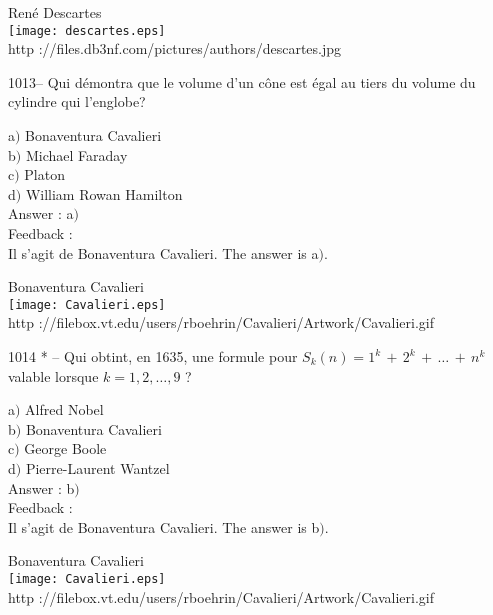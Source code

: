 ﻿\documentclass[letterpaper, 12pt]{article}
\begin{document}
        \begin{center}
        Ren\'e Descartes\\
    \texttt{[image: descartes.eps]}\\
        {\footnotesize http
://files.db3nf.com/pictures/authors/descartes.jpg}
    \end{center}

1013-- Qui d\'emontra que le volume d'un c\^one est \'egal au tiers
du volume du cylindre qui l'englobe?

a$)$ Bonaventura Cavalieri \\
b$)$ Michael Faraday \\
c$)$ Platon \\
d$)$ William Rowan Hamilton\\

Answer : a$)$\\

Feedback : \\
Il s'agit de Bonaventura Cavalieri.
The answer is a$)$.\\

        \begin{center}
        Bonaventura Cavalieri\\
    \texttt{[image: Cavalieri.eps]}\\
        {\footnotesize http
://filebox.vt.edu/users/rboehrin/Cavalieri/Artwork/Cavalieri.gif}
    \end{center}

1014 * -- Qui obtint, en 1635, une formule pour
$S_k(n)=1^k\,+\,2^k\,+\,\ldots\,+\,n^k$ valable lorsque
$k=1,2,\ldots,9$ ?

a$)$ Alfred Nobel \\
b$)$ Bonaventura Cavalieri \\
c$)$ George Boole \\
d$)$ Pierre-Laurent Wantzel\\

Answer : b$)$\\

Feedback : \\
Il s'agit de Bonaventura Cavalieri.
The answer is b$)$.\\

        \begin{center}
        Bonaventura Cavalieri\\
    \texttt{[image: Cavalieri.eps]}\\
        {\footnotesize http
://filebox.vt.edu/users/rboehrin/Cavalieri/Artwork/Cavalieri.gif}
    \end{center}
\end{document}
